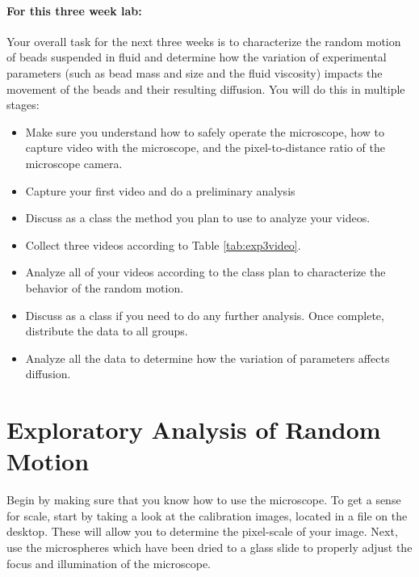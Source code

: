 \paragraph{For this three week lab:} Your overall task for the next three weeks is to characterize the random motion of beads suspended in fluid and determine how the variation of experimental parameters (such as bead mass and size and the fluid viscosity) impacts the movement of the beads and their resulting diffusion.
You will do this in multiple stages:
\begin{itemize}
\item Make sure you understand how to safely operate the microscope, how to capture video with the microscope, and the pixel-to-distance ratio of the microscope camera.
\item Capture your first video and do a preliminary analysis
\item Discuss as a class the method you plan to use to analyze your videos.
\item Collect three videos according to Table \ref{tab:exp3video}.
\item Analyze all of your videos according to the class plan to characterize the behavior of the random motion.
\item Discuss as a class if you need to do any further analysis. Once complete, distribute the data to all groups.
\item Analyze all the data to determine how the variation of parameters affects diffusion.
\end{itemize}

\section{Exploratory Analysis of Random Motion}
Begin by making sure that you know how to use the microscope.
To get a sense for scale, start by taking a look at the calibration images, located in a file on the desktop.
These will allow you to determine the pixel-scale of your image.
Next, use the microspheres which have been dried to a glass slide to properly adjust the focus and illumination of the microscope.
